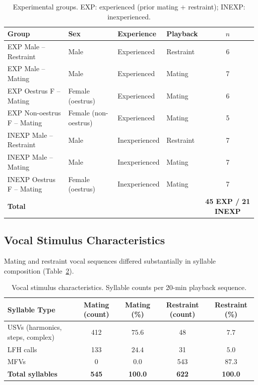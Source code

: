 \documentclass[11pt]{article}
\begin{document}
\begin{table}[H]
\centering
\caption{Experimental groups. EXP: experienced (prior mating + restraint); INEXP: inexperienced.}
\label{tab:groups}
\begin{tabular}{llllc}
\toprule
Group & Sex & Experience & Playback & $n$ \\
\midrule
EXP Male -- Restraint & Male & Experienced & Restraint & 6 \\
EXP Male -- Mating & Male & Experienced & Mating & 7 \\
EXP Oestrus F -- Mating & Female (oestrus) & Experienced & Mating & 6 \\
EXP Non-oestrus F -- Mating & Female (non-oestrus) & Experienced & Mating & 5 \\
INEXP Male -- Restraint & Male & Inexperienced & Restraint & 7 \\
INEXP Male -- Mating & Male & Inexperienced & Mating & 7 \\
INEXP Oestrus F -- Mating & Female (oestrus) & Inexperienced & Mating & 7 \\
\midrule
\textbf{Total} & & & & \textbf{45 EXP / 21 INEXP} \\
\bottomrule
\end{tabular}
\end{table}

\subsection{Vocal Stimulus Characteristics}

Mating and restraint vocal sequences differed substantially in syllable composition (Table~\ref{tab:stimuli}).

\begin{table}[H]
\centering
\caption{Vocal stimulus characteristics. Syllable counts per 20-min playback sequence.}
\label{tab:stimuli}
\begin{tabular}{lcccc}
\toprule
Syllable Type & Mating (count) & Mating (\%) & Restraint (count) & Restraint (\%) \\
\midrule
USVs (harmonics, steps, complex) & 412 & $75.6$ & 48 & $7.7$ \\
LFH calls & 133 & $24.4$ & 31 & $5.0$ \\
MFVs & 0 & $0.0$ & 543 & $87.3$ \\
\midrule
\textbf{Total syllables} & \textbf{545} & \textbf{100.0} & \textbf{622} & \textbf{100.0} \\
\bottomrule
\end{tabular}
\end{table}
\end{document}
